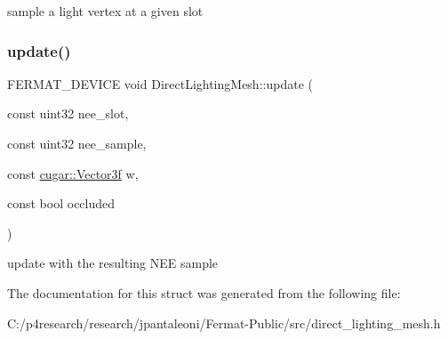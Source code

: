 sample a light vertex at a given slot \mbox{\label{struct_direct_lighting_mesh_a3328811ee1cbe8a570f7b5d0b2c6a4f4}} 
\subsubsection{\texorpdfstring{update()}{update()}}
{\footnotesize\ttfamily F\+E\+R\+M\+A\+T\+\_\+\+D\+E\+V\+I\+CE void Direct\+Lighting\+Mesh\+::update (\begin{DoxyParamCaption}\item[{const uint32}]{nee\+\_\+slot,  }\item[{const uint32}]{nee\+\_\+sample,  }\item[{const \hyperlink{structcugar_1_1_vector}{cugar\+::\+Vector3f}}]{w,  }\item[{const bool}]{occluded }\end{DoxyParamCaption})\hspace{0.3cm}{\ttfamily [inline]}}

update with the resulting N\+EE sample 

The documentation for this struct was generated from the following file\+:\begin{DoxyCompactItemize}
\item 
C\+:/p4research/research/jpantaleoni/\+Fermat-\/\+Public/src/direct\+\_\+lighting\+\_\+mesh.\+h\end{DoxyCompactItemize}

